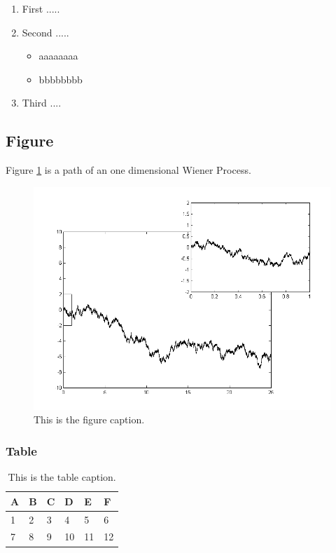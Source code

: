\documentclass{article}
\begin{document}
\begin{enumerate}
	\item First .....
	\item Second .....
	\begin{itemize}
		\item aaaaaaaa
		\item bbbbbbbb
	\end{itemize}
	\item Third ....
\end{enumerate}

\subsection{Figure}

Figure \ref{fig1} is a path of an one dimensional Wiener Process.

\begin{figure}[htbp]
	\centering
	\includegraphics[width=0.7\linewidth]{Wiener_process_zoom}
	\caption{This is the figure caption.}
	\label{fig1}
\end{figure}

\subsubsection{Table}

\begin{table}[htbp]
	\centering
	\begin{tabular}{l|lllll}
		\hline
		A & B & C & D & E  & F \\ \hline
		1 & 2 & 3 & 4 & 5  & 6 \\
		7 & 8 & 9 & 10 & 11 & 12 \\ \hline
	\end{tabular}
	\caption{This is the table caption.}
\end{table}
\end{document}
